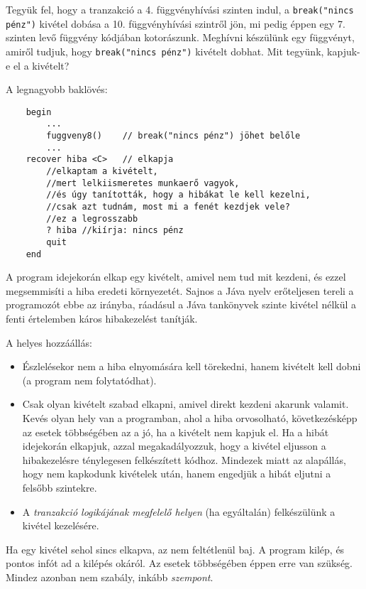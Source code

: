 Tegyük fel, hogy a tranzakció a 4. függvényhívási szinten indul,
a \verb!break("nincs pénz")! kivétel dobása a 10. függvényhívási szintről jön,
mi pedig éppen egy 7. szinten levő függvény kódjában kotorászunk.
Meghívni készülünk egy függvényt, amiről tudjuk, hogy 
\verb!break("nincs pénz")! kivételt dobhat. Mit tegyünk, kapjuk-e el a kivételt?

A legnagyobb baklövés:
\begin{verbatim}
    begin
        ...
        fuggveny8()    // break("nincs pénz") jöhet belőle
        ...
    recover hiba <C>   // elkapja
        //elkaptam a kivételt,
        //mert lelkiismeretes munkaerő vagyok,
        //és úgy tanították, hogy a hibákat le kell kezelni,
        //csak azt tudnám, most mi a fenét kezdjek vele?
        //ez a legrosszabb        
        ? hiba //kiírja: nincs pénz
        quit
    end
\end{verbatim}
A program idejekorán elkap egy kivételt, 
amivel nem tud mit kezdeni, és ezzel megsemmisíti a hiba eredeti környezetét.
Sajnos a Jáva nyelv erőteljesen tereli a programozót ebbe az irányba,
ráadásul a Jáva tankönyvek szinte kivétel nélkül a fenti értelemben
káros hibakezelést tanítják.

A helyes hozzáállás:
\begin{itemize}
 \item 
    Észlelésekor nem a hiba elnyomására kell törekedni, 
    hanem kivételt kell dobni (a program nem folytatódhat).
 \item
    Csak olyan kivételt szabad elkapni, 
        amivel direkt kezdeni akarunk valamit.
    Kevés olyan hely van a programban, 
        ahol a hiba orvosolható, következésképp 
            az esetek többségében az a jó, ha a kivételt nem kapjuk el.
    Ha a hibát idejekorán elkapjuk, azzal megakadályozzuk, 
        hogy a kivétel eljusson a hibakezelésre ténylegesen felkészített kódhoz.
    Mindezek miatt az alapállás, 
        hogy nem kapkodunk kivételek után,
          hanem engedjük a hibát eljutni a felsőbb szintekre.
 \item
   A {\em tranzakció logikájának megfelelő helyen\/} (ha egyáltalán)
   felkészülünk a kivétel kezelésére.
\end{itemize}
Ha egy kivétel sehol sincs elkapva, az nem feltétlenül baj. 
A program kilép, és pontos infót ad a kilépés okáról. 
Az esetek többségében éppen erre van szükség.
Mindez azonban nem szabály, inkább {\em szempont}.







